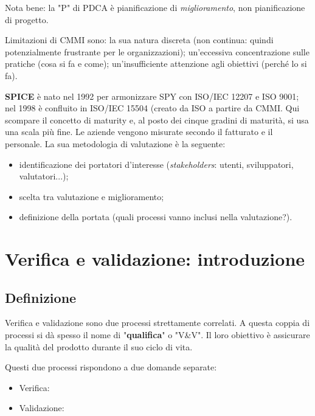 \documentclass[a4paper]{article}
\begin{document}
		
Nota bene: la "P" di PDCA è pianificazione di \emph{miglioramento}, non pianificazione di progetto.
		
Limitazioni di CMMI sono: la sua natura discreta (non continua: quindi potenzialmente frustrante per le organizzazioni); un'eccessiva concentrazione sulle pratiche (cosa si fa e come); un'insufficiente attenzione agli obiettivi (perché lo si fa).
		
\textbf{SPICE} è nato nel 1992 per armonizzare SPY con ISO/IEC 12207 e ISO 9001; nel 1998 è confluito in ISO/IEC 15504 (creato da ISO a partire da CMMI. Qui scompare il concetto di maturity e, al posto dei cinque gradini di maturità, si usa una scala più fine. Le aziende vengono misurate secondo il fatturato e il personale. La sua metodologia di valutazione è la seguente:
		
	\begin{itemize}
		
			
	\item identificazione dei portatori d'interesse (\emph{stakeholders}: utenti, sviluppatori, valutatori...);
			
	\item scelta tra valutazione e miglioramento;%

			
	\item definizione della portata (quali processi vanno inclusi nella valutazione?).
		
	\end{itemize}

	


		
	\section{Verifica e validazione: introduzione}


		
	\subsection{Definizione}

		
Verifica e validazione sono due processi strettamente correlati. A questa coppia di processi si dà spesso il nome di "\textbf{qualifica}" o "V\&{}V". Il loro obiettivo è assicurare la qualità del prodotto durante il suo ciclo di vita.
		
Questi due processi rispondono a due domande separate:
		
	\begin{itemize}
		
			
	\item Verifica: 
			
	\item Validazione: 
		
	\end{itemize}
\end{document}
